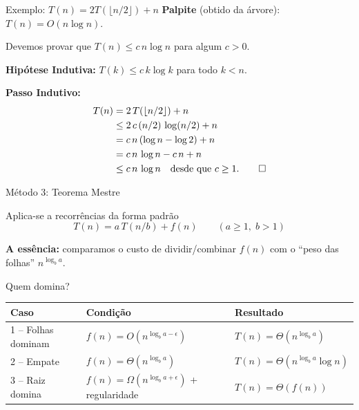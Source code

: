 \documentclass[aspectratio=169]{beamer}
\begin{document}
\begin{frame}{Exemplo: $T(n) = 2T(\lfloor n/2 \rfloor) + n$}
    \textbf{Palpite} (obtido da árvore): $T(n) = O(n \log n)$.
    
    Devemos provar que $T(n) \le c\, n \log n$ para algum $c > 0$.
    
    \vspace{0.3cm}
    \textbf{Hipótese Indutiva:} $T(k) \le c\, k \log k$ para todo $k < n$.
    
    \vspace{0.3cm}
    \textbf{Passo Indutivo:}
    \begin{align*}
        T(n) &= 2\,T(\lfloor n/2 \rfloor) + n \\
             &\le 2\,c\,(n/2)\,\log(n/2) + n \\
             &= c\,n\,(\log n - \log 2) + n \\
             &= c\,n\,\log n - c\,n + n \\
             &\le c\,n\,\log n \quad \text{desde que } c \ge 1. \qed
    \end{align*}
\end{frame}

\begin{frame}[shrink]{Método 3: Teorema Mestre}
    \begin{block}{Aplica-se a recorrências da forma padrão}
        $$T(n) = a\,T(n/b) + f(n) \qquad (a \ge 1, \; b > 1)$$
    \end{block}
    
    \vspace{0.3cm}
    \textbf{A essência:} comparamos o custo de dividir/combinar $f(n)$ com o ``peso das folhas'' $n^{\log_b a}$.
    
    \vspace{0.3cm}
    Quem domina?
    \begin{center}
    \renewcommand{\arraystretch}{1.4}
    \begin{tabular}{lll}
        \toprule
        \textbf{Caso} & \textbf{Condição} & \textbf{Resultado} \\
        \midrule
        1 -- Folhas dominam & $f(n) = O(n^{\log_b a - \epsilon})$ & $T(n) = \Theta(n^{\log_b a})$ \\
        2 -- Empate & $f(n) = \Theta(n^{\log_b a})$ & $T(n) = \Theta(n^{\log_b a} \log n)$ \\
        3 -- Raiz domina & $f(n) = \Omega(n^{\log_b a + \epsilon})$ \small{+ regularidade} & $T(n) = \Theta(f(n))$ \\
        \bottomrule
    \end{tabular}
    \end{center}
\end{frame}
\end{document}
